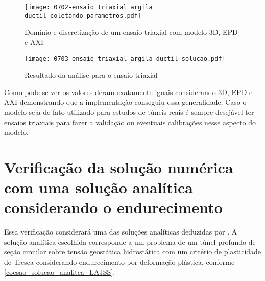 \begin{figure}[H]
 	\begin{center}
 		\texttt{[image: 0702-ensaio triaxial argila ductil\_coletando\_parametros.pdf]}
 	\end{center}
 	\caption{\label{ensaio_triaxial_parametros}Domínio e discretização de um ensaio triaxial com modelo 3D, EPD e AXI}
\end{figure}

\begin{figure}[H]
	\begin{center}
		\texttt{[image: 0703-ensaio triaxial argila ductil solucao.pdf]}
	\end{center}
	\caption{\label{ensaio_triaxial_solucao}Resultado da análise para o ensaio triaxial}
\end{figure}

Como pode-se ver os valores deram exatamente iguais considerando 3D, EPD e AXI demonstrando que a implementação conseguiu essa generalidade. Caso o modelo seja de fato utilizado para estudos de túneis reais é sempre desejável ter ensaios triaxiais para fazer a validação ou eventuais calibrações nesse aspecto do modelo.

\section{Verificação da solução numérica com uma solução analítica considerando o endurecimento}

Essa verificação considerará uma das soluções analíticas deduzidas por . A solução analítica escolhida corresponde a um problema de um túnel profundo de seção circular sobre tensão geostática hidrostática com um critério de plasticidade de Tresca considerando endurecimento por deformação plástica, conforme \autoref{coesao_solucao_analitca_LAJSS}. 

